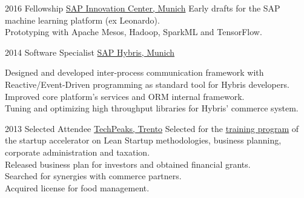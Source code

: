 \documentclass[letterpaper]{twentysecondcv} %
\begin{document}
\begin{twenty}
{	    }
        
	\twentyitem
    	{2016}
		{}
        {Fellowship}
        {\href{https://icn.sap.com/}{SAP Innovation Center, Munich}}
        {}
        {
        {
        Early drafts for the SAP machine learning platform (ex Leonardo).\\
        Prototyping with Apache Mesos, Hadoop, SparkML and TensorFlow.
        }
        }
    
    \twentyitem
   		{2014}
		{}
        {Software Specialist}
        {\href{http://www.hybris.com}{SAP Hybris, Munich}}
        {}
        {
        {
        Designed and developed inter-process communication framework with Reactive/Event-Driven programming as standard tool for Hybris developers.
        \\
        Improved core platform's services and ORM internal framework.\\
        Tuning and optimizing high throughput libraries for Hybris' commerce system.  

    }
        }
     
     \twentyitem
   		{2013}
		{}
        {Selected Attendee}
        {\href{https://www.repubblica.it/rubriche/startup-stories/2013/12/02/news/incubatore_startup-72502909/}{TechPeaks, Trento}}
        {}
        {
Selected for the \href{https://www.repubblica.it/rubriche/startup-stories/2013/12/02/news/incubatore_startup-72502909/}{\underline{training program}} of the startup accelerator on Lean Startup methodologies, business planning, corporate administration and taxation.\\
Released business plan for investors and obtained financial grants.\\
Searched for synergies with commerce partners.\\
Acquired license for food management.
    	}
    	

\end{twenty}
\end{document}
